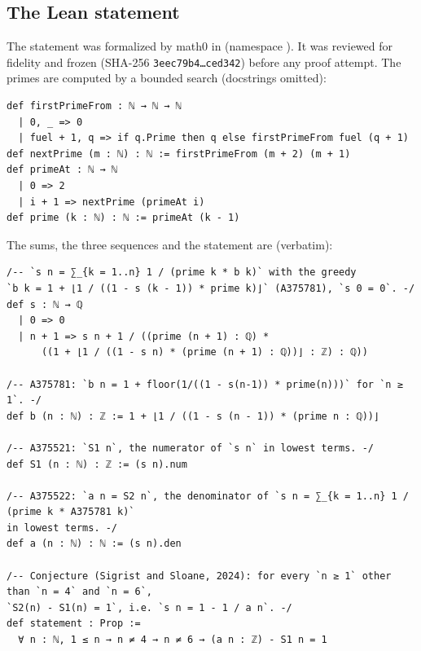 \documentclass[11pt]{amsart}
\theoremstyle{plain}
\theoremstyle{definition}
\begin{document}
\subsection{The Lean statement}
The statement was formalized by math0 in  (namespace ). It was reviewed for fidelity and frozen (SHA-256 \texttt{3eec79b4\dots ced342}) before any proof attempt. The primes are computed by a bounded search (docstrings omitted):
\begin{lstlisting}
def firstPrimeFrom : ℕ → ℕ → ℕ
  | 0, _ => 0
  | fuel + 1, q => if q.Prime then q else firstPrimeFrom fuel (q + 1)
def nextPrime (m : ℕ) : ℕ := firstPrimeFrom (m + 2) (m + 1)
def primeAt : ℕ → ℕ
  | 0 => 2
  | i + 1 => nextPrime (primeAt i)
def prime (k : ℕ) : ℕ := primeAt (k - 1)
\end{lstlisting}
The sums, the three sequences and the statement are (verbatim):
\begin{lstlisting}
/-- `s n = ∑_{k = 1..n} 1 / (prime k * b k)` with the greedy
`b k = 1 + ⌊1 / ((1 - s (k - 1)) * prime k)⌋` (A375781), `s 0 = 0`. -/
def s : ℕ → ℚ
  | 0 => 0
  | n + 1 => s n + 1 / ((prime (n + 1) : ℚ) *
      ((1 + ⌊1 / ((1 - s n) * (prime (n + 1) : ℚ))⌋ : ℤ) : ℚ))

/-- A375781: `b n = 1 + floor(1/((1 - s(n-1)) * prime(n)))` for `n ≥ 1`. -/
def b (n : ℕ) : ℤ := 1 + ⌊1 / ((1 - s (n - 1)) * (prime n : ℚ))⌋

/-- A375521: `S1 n`, the numerator of `s n` in lowest terms. -/
def S1 (n : ℕ) : ℤ := (s n).num

/-- A375522: `a n = S2 n`, the denominator of `s n = ∑_{k = 1..n} 1 / (prime k * A375781 k)`
in lowest terms. -/
def a (n : ℕ) : ℕ := (s n).den

/-- Conjecture (Sigrist and Sloane, 2024): for every `n ≥ 1` other than `n = 4` and `n = 6`,
`S2(n) - S1(n) = 1`, i.e. `s n = 1 - 1 / a n`. -/
def statement : Prop :=
  ∀ n : ℕ, 1 ≤ n → n ≠ 4 → n ≠ 6 → (a n : ℤ) - S1 n = 1
\end{lstlisting}
\end{document}
